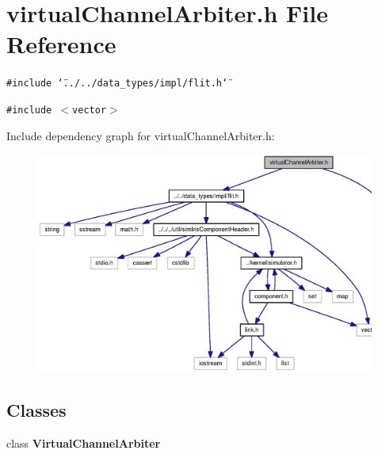 \section{virtualChannelArbiter.h File Reference}
\label{virtualChannelArbiter_8h}
{\tt \#include \char`\"{}../../data\_\-types/impl/flit.h\char`\"{}}\par
{\tt \#include $<$vector$>$}\par


Include dependency graph for virtualChannelArbiter.h:\nopagebreak
\begin{figure}[H]
\begin{center}
\leavevmode
\includegraphics[width=316pt]{virtualChannelArbiter_8h__incl}
\end{center}
\end{figure}
\subsection*{Classes}
\begin{CompactItemize}
\item 
class {\bf VirtualChannelArbiter}
\end{CompactItemize}
